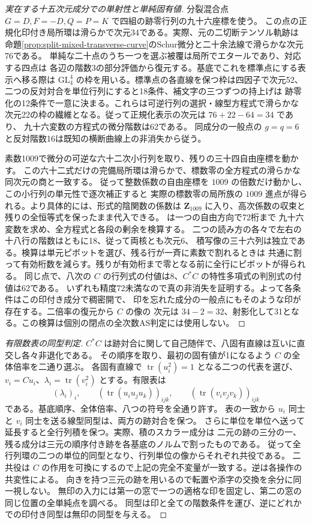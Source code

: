\begin{proof}[実在する十五次元成分での単射性と単純固有値]
分裂混合点 $G=D,F=-D,Q=P=K$ で四組の跡零行列の九十六座標を使う。
この点の正規化印付き局所環は滑らかで次元34である。実際、元の二切断テンソル軌跡は
命題\ref{prop:split-mixed-transverse-curve}のSchur微分と二十余法線で滑らかな次元76である。
単純な二十点のうち一つを選ぶ被覆は局所でエタールであり、対応する四点は
各辺の階数3の部分評価から復元する。基底でこれを標準点にする表示へ移る際は
$\mathrm{GL}_4^4$ の枠を用いる。標準点の各直線を保つ枠は四因子で次元52、
二つの反対対合を単位行列にすると18条件、補文字の三つずつの持上げは
跡零化の12条件で一意に決まる。これらは可逆行列の選択・線型方程式で滑らかな
次元22の枠の繊維となる。従って正規化表示の次元は $76+22-64=34$ であり、
九十六変数の方程式の微分階数は62である。
同成分の一般点の $g=q=6$ と反対階数16は既知の横断曲線上の非消失から従う。

素数1009で微分の可逆な六十二次小行列を取り、残りの三十四自由座標を動かす。
この六十二式だけの完備局所環は滑らかで、標数零の全方程式の滑らかな同次元の商と一致する。
従って整数係数の自由座標を $1009$ の倍数だけ動かし、この小行列の単元性で逐次補正すると
実際の標数零の局所族の $1009$ 進点が得られる。より具体的には、形式的陰関数の係数は
$\mathbf Z_{1009}$ に入り、高次係数の収束と残りの全恒等式を保ったまま代入できる。
 は一つの自由方向で72桁まで
九十六変数を求め、全方程式と各段の剰余を検算する。
二つの読み方の各々で左右の十八行の階数はともに18、従って両核とも次元6、
積写像の三十六列は独立である。検算は単元ピボットを選び、残る行が一斉に素数で割れるときは
共通に割って有効桁数を減らす。残りが有効桁まで零となる前に全行にピボットが得られる。
同じ点で、八次の $C$ の行列式の付値は8、$C^*C$ の特性多項式の判別式の付値は62である。
いずれも精度72未満なので真の非消失を証明する。よって各条件はこの印付き成分で稠密開で、
印を忘れた成分の一般点にもそのような印が存在する。二倍率の復元から $C$ の像の
次元は $34-2=32$、射影化して31となる。この検算は個別の閉点の全次数AS判定には使用しない。
\end{proof}

\begin{proof}[有限数表の同型判定]
$C^*C$ は跡対合に関して自己随伴で、八固有直線は互いに直交し各々非退化である。
その順序を取り、最初の固有値が1になるよう $C$ の全体倍率を二通り選ぶ。
各固有直線で $\operatorname{tr}(u_i^2)=1$ となる二つの代表を選び、
$v_i=C u_i$、$\lambda_i=\operatorname{tr}(v_i^2)$ とする。有限表は
\[
    (\lambda_i)_i,\qquad (\operatorname{tr}(u_i u_j u_k))_{ijk},\qquad
                            (\operatorname{tr}(v_i v_j v_k))_{ijk}
\]
である。基底順序、全体倍率、八つの符号を全通り許す。
表の一致から $u_i$ 同士と $v_i$ 同士を送る線型同型は、両方の跡対合を保つ。
さらに単位を単位へ送って延長すると全行列積を保つ。実際、積のスカラー成分は
二元の跡の三分の一、残る成分は三元の順序付き跡を各基底のノルムで割ったものである。
従って全行列環の二つの単位的同型となり、行列単位の像からそれぞれ共役である。
二共役は $C$ の作用を可換にするので上記の完全不変量が一致する。逆は各操作の共変性による。
向きを持つ三元の跡を用いるので転置や添字の交換を余分に同一視しない。
無印の入力には第一の窓で一つの適格な印を固定し、第二の窓の同じ位置の全単純点を調べる。
同型は印と全ての階数条件を運び、逆にどれかでの印付き同型は無印の同型を与える。
\end{proof}
